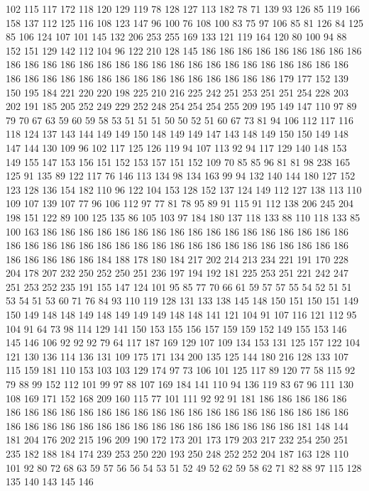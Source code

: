 102 115 117 172 118 120 129 119 78 128 127 113 182 78 71 139 93 126 85 119
166 158 137 112 125 116 108 123 147 96 100 76 108 100 83 75 97 106 85 81
126 84 125 85 106 124 107 101 145 132 206 253 255 169 133 121 119 164 120 80
100 94 88 152 151 129 142 112 104 96 122 210 128 145 186 186 186 186 186 186
186 186 186 186 186 186 186 186 186 186 186 186 186 186 186 186 186 186 186 186
186 186 186 186 186 186 186 186 186 186 186 186 186 186 186 186 186 179 177 152
139 150 195 184 221 220 220 198 225 210 216 225 242 251 253 251 251 254 228 203
202 191 185 205 252 249 229 252 248 254 254 254 255 209 195 149 147 110 97 89
79 70 67 63 59 60 59 58 53 51 51 51 50 50 52 51 60 67 73 81
94 106 112 117 116 118 124 137 143 144 149 149 150 148 149 149 147 143 148 149
150 150 149 148 147 144 130 109 96 102 117 125 126 119 94 107 113 92 94 117
129 140 148 153 149 155 147 153 156 151 152 153 157 151 152 109 70 85 85 96
81 81 98 238 165 125 91 135 89 122 117 76 146 113 134 98 134 163 99 94
132 140 144 180 127 152 123 128 136 154 182 110 96 122 104 153 128 152 137 124
149 112 127 138 113 110 109 107 139 107 77 96 106 112 97 77 81 78 95 89
91 115 91 112 138 206 245 204 198 151 122 89 100 125 135 86 105 103 97 184
180 137 118 133 88 110 118 133 85 100 163 186 186 186 186 186 186 186 186 186
186 186 186 186 186 186 186 186 186 186 186 186 186 186 186 186 186 186 186 186
186 186 186 186 186 186 186 186 186 186 186 186 184 188 178 180 184 217 202 214
213 234 221 191 170 228 204 178 207 232 250 252 250 251 236 197 194 192 181 225
253 251 221 242 247 251 253 252 235 191 155 147 124 101 95 85 77 70 66 61
59 57 57 55 54 52 51 51 53 54 51 53 60 71 76 84 93 110 119 128
131 133 138 145 148 150 151 150 151 149 150 149 148 148 149 148 149 149 149 148
148 141 121 104 91 107 116 121 112 95 104 91 64 73 98 114 129 141 150 153
155 156 157 159 159 152 149 155 153 146 145 146 106 92 92 92 79 64 117 187
169 129 107 109 134 153 131 125 157 122 104 121 130 136 114 136 131 109 175 171
134 200 135 125 144 180 216 128 133 107 115 159 181 110 153 103 103 129 174 97
73 106 101 125 117 89 120 77 58 115 92 79 88 99 152 112 101 99 97 88
107 169 184 141 110 94 136 119 83 67 96 111 130 108 169 171 152 168 209 160
115 77 101 111 92 92 91 181 186 186 186 186 186 186 186 186 186 186 186 186
186 186 186 186 186 186 186 186 186 186 186 186 186 186 186 186 186 186 186 186
186 186 186 186 186 186 186 186 181 148 144 181 204 176 202 215 196 209 190 172
173 201 173 179 203 217 232 254 250 251 235 182 188 184 174 239 253 250 220 193
250 248 252 252 204 187 163 128 110 101 92 80 72 68 63 59 57 56 56 54
53 51 52 49 52 62 59 58 62 71 82 88 97 115 128 135 140 143 145 146
